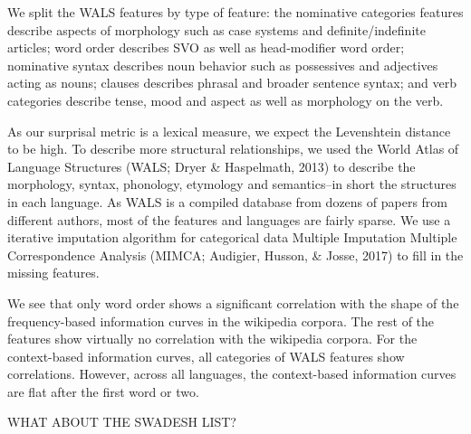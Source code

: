 \documentclass[10pt, letterpaper]{article}
\begin{document}
We split the WALS features by type of feature: the nominative categories
features describe aspects of morphology such as case systems and
definite/indefinite articles; word order describes SVO as well as
head-modifier word order; nominative syntax describes noun behavior such
as possessives and adjectives acting as nouns; clauses describes phrasal
and broader sentence syntax; and verb categories describe tense, mood
and aspect as well as morphology on the verb.

As our surprisal metric is a lexical measure, we expect the Levenshtein
distance to be high. To describe more structural relationships, we used
the World Atlas of Language Structures (WALS; Dryer \& Haspelmath, 2013)
to describe the morphology, syntax, phonology, etymology and
semantics--in short the structures in each language. As WALS is a
compiled database from dozens of papers from different authors, most of
the features and languages are fairly sparse. We use a iterative
imputation algorithm for categorical data Multiple Imputation Multiple
Correspondence Analysis (MIMCA; Audigier, Husson, \& Josse, 2017) to
fill in the missing features.

We see that only word order shows a significant correlation with the
shape of the frequency-based information curves in the wikipedia
corpora. The rest of the features show virtually no correlation with the
wikipedia corpora. For the context-based information curves, all
categories of WALS features show correlations. However, across all
languages, the context-based information curves are flat after the first
word or two.

WHAT ABOUT THE SWADESH LIST?
\end{document}
